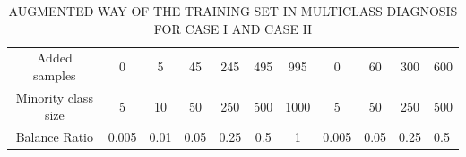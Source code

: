 \begin{table}[htbp]
\centering
\caption{AUGMENTED WAY OF THE TRAINING SET IN MULTICLASS DIAGNOSIS FOR CASE I AND CASE II}
\label{tab:augmentation}
\begin{tabular}{cccccccccc}
\toprule
Added samples & 0 & 5 & 45 & 245 & 495 & 995 & 0 & 60 & 300 & 600 \\
Minority class size & 5 & 10 & 50 & 250 & 500 & 1000 & 5 & 50 & 250 & 500 \\
Balance Ratio & 0.005 & 0.01 & 0.05 & 0.25 & 0.5 & 1 & 0.005 & 0.05 & 0.25 & 0.5 \\
\midrule
\end{tabular}
\end{table}
